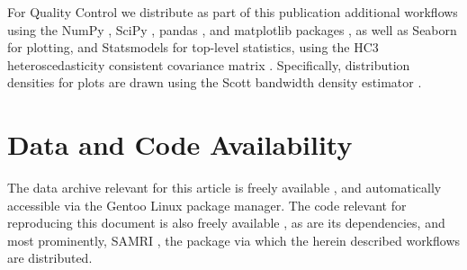 For Quality Control we distribute as part of this publication additional workflows using the NumPy \cite{numpy}, SciPy \cite{scipy}, pandas \cite{pandas}, and matplotlib packages \cite{matplotlib}, as well as Seaborn \cite{seaborn} for plotting, and Statsmodels \cite{statsmodels} for top-level statistics, using the HC3 heteroscedasticity consistent covariance matrix \cite{long2000}.
Specifically, distribution densities for plots are drawn using the Scott bandwidth density estimator \cite{Scott1979}.

\section{Data and Code Availability}

The data archive relevant for this article is freely available \cite{irsabi_bidsdata}, and automatically accessible via the Gentoo Linux package manager.
The code relevant for reproducing this document is also freely available \cite{source}, as are its dependencies, and most prominently, SAMRI \cite{samri}, the package via which the herein described workflows are distributed.
